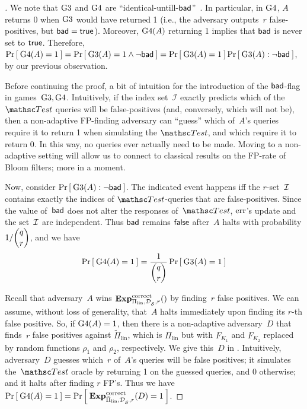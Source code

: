 \begin{proof}[]
We note that $\text{G3}$ and $\text{G4}$ are
``identical-untill-$\mathsf{bad}$''~\cite{BeRo-gameplaying}.  In particular,
in $\text{G4}$, $A$ returns 0 when $\text{G3}$ would have returned 1 (i.e.,
the adversary outputs~$r$ false-positives, but $\mathsf{bad}=\mathsf{true}$).  
Moreover,  $\text{G4}(A)$ returning 1 implies that $\mathsf{bad}$ is never set to $\mathsf{true}$. Therefore,
$\Pr\left[\: \text{G4}(A)=1 \:\right] = \Pr\left[\: \text{G3}(A)=1 \wedge \neg\mathsf{bad} \:\right] =
\Pr\left[\: \text{G3}(A)=1 \:\right] \Pr\left[\: \text{G3}(A) : \neg\mathsf{bad} \:\right]$, by our previous observation.

Before continuing the proof, a bit of intuition for the introduction
of the $\mathsf{bad}$-flag in games~$\text{G3},\text{G4}$.   Intuitively, if the index
set~$\mathcal{I}$ exactly predicts which of the $\Test$ queries will be
false-positives (and, conversely, which will not be), then a
non-adaptive FP-finding adversary can ``guess'' which of~$A$'s queries require it
to return 1 when simulating the $\Test$, and which require it to
return 0.  In this way, no queries ever actually need to be made.
Moving to a non-adaptive setting will allow us to connect to classical
results on the FP-rate of Bloom filters; more in a moment. 

Now, consider $\Pr\left[\: \text{G3}(A) : \neg\mathsf{bad} \:\right]$.  The indicated event
happens iff the $r$-set~${\cal I}$ contains exactly the indices of
$\Test$-queries that are false-positives.  Since the value
of~$\mathsf{bad}$ does not alter the responses of~$\Test$, $\mathrm{err}$'s update
and the set~${\cal I}$ are independent.
Thus $\mathsf{bad}$ remains $\mathsf{false}$ after~$A$ halts with probability
$1/\dbinom{q}{r}$, and we have 
\begin{equation*}
\Pr\left[\: \text{G4}(A)=1 \:\right] = \frac{1}{\dbinom{q}{r}}\Pr\left[\: \text{G3}(A)=1 \:\right]
\end{equation*}

Recall that adversary~$A$ wins $\mathrm{\mathbf{Exp}}^{\mathrm{correct}}_{\Pi_{\mathrm{lin}},\mathcal{D}_{{\cal S}}^{},r}()$ by finding~$r$ false positives. We can assume, without loss of generality,  that~$A$ halts immediately upon finding its $r$-th false positive. %
%
So, if $\text{G4}(A)=1$, then there is a non-adaptive adversary~$D$ that finds~$r$ false positives against $\tilde{\Pi}_{\mathrm{lin}}$, which is $\Pi_{\mathrm{lin}}$ but with $F_{K_1}$ and $F_{K_2}$ replaced by random functions $\rho_1$ and $\rho_2$, respectively.  We give this~$D$ in . Intuitively, adversary~$D$ guesses which~$r$ of~$A$'s queries will be false positives; it simulates the~$\Test$ oracle by returning 1 on the guessed queries, and 0 otherwise; and it halts after finding $r$ FP's.  Thus we have
$\Pr\left[\: \text{G4}(A)=1 \:\right] =\Pr\left[\: \mathrm{\mathbf{Exp}}^{\mathrm{correct}}_{\tilde{\Pi}_{\mathrm{lin}},\mathcal{D}_{{\cal S}}^{},r}(D) = 1 \:\right]$.


\end{proof}
